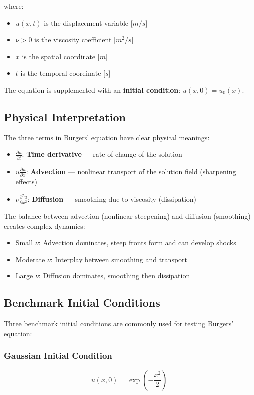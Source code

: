 \documentclass[12pt, a4paper]{report}
\newcommand{\pd}[2]{\frac{\partial #1}{\partial #2}}
\newcommand{\pdd}[2]{\frac{\partial^2 #1}{\partial #2^2}}
\begin{document}
where:
\begin{itemize}
    \item $u(x, t)$ is the displacement variable [$m/s$]
    \item $\nu > 0$ is the viscosity coefficient [$m^2/s$]
    \item $x$ is the spatial coordinate [$m$]
    \item $t$ is the temporal coordinate [$s$]
\end{itemize}

The equation is supplemented with an \textbf{initial condition}: $u(x, 0) = u_0(x)$.

\subsection{Physical Interpretation}

The three terms in Burgers' equation have clear physical meanings:

\begin{itemize}
    \item $\pd{u}{t}$: \textbf{Time derivative} — rate of change of the solution
    \item $u \pd{u}{x}$: \textbf{Advection} — nonlinear transport of the solution field (sharpening effects)
    \item $\nu \pdd{u}{x}$: \textbf{Diffusion} — smoothing due to viscosity (dissipation)
\end{itemize}

The balance between advection (nonlinear steepening) and diffusion (smoothing) creates complex dynamics:
\begin{itemize}
    \item Small $\nu$: Advection dominates, steep fronts form and can develop shocks
    \item Moderate $\nu$: Interplay between smoothing and transport
    \item Large $\nu$: Diffusion dominates, smoothing then dissipation
\end{itemize}

\subsection{Benchmark Initial Conditions}

Three benchmark initial conditions are commonly used for testing Burgers' equation:

\subsubsection{Gaussian Initial Condition}
\begin{equation}
u(x, 0) = \exp\left(-\frac{x^2}{2}\right)
\end{equation}
\end{document}
